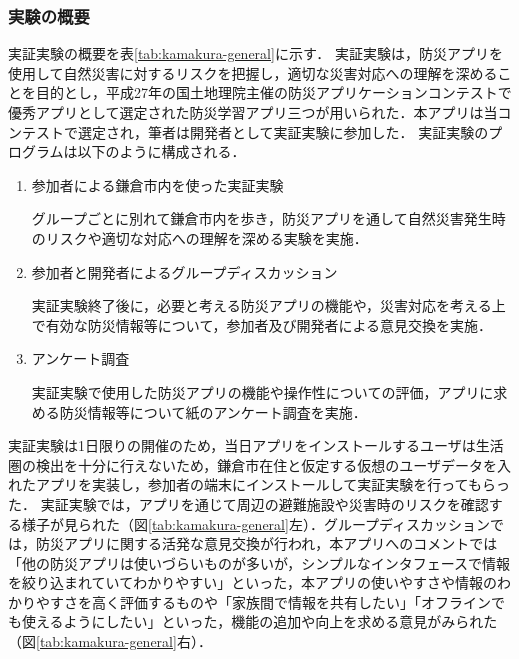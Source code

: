 \documentclass[a4paper]{jsarticle}
\begin{document}
\subsubsection{実験の概要}
実証実験の概要を表\ref{tab:kamakura-general}に示す．
実証実験は，防災アプリを使用して自然災害に対するリスクを把握し，適切な災害対応への理解を深めることを目的とし，平成27年の国土地理院主催の防災アプリケーションコンテストで優秀アプリとして選定された防災学習アプリ三つが用いられた．本アプリは当コンテストで選定され，筆者は開発者として実証実験に参加した．
実証実験のプログラムは以下のように構成される．

\begin{enumerate}
  \item 参加者による鎌倉市内を使った実証実験

  グループごとに別れて鎌倉市内を歩き，防災アプリを通して自然災害発生時のリスクや適切な対応への理解を深める実験を実施．

  \item 参加者と開発者によるグループディスカッション

  実証実験終了後に，必要と考える防災アプリの機能や，災害対応を考える上で有効な防災情報等について，参加者及び開発者による意見交換を実施．

  \item アンケート調査

  実証実験で使用した防災アプリの機能や操作性についての評価，アプリに求める防災情報等について紙のアンケート調査を実施．

\end{enumerate}

実証実験は1日限りの開催のため，当日アプリをインストールするユーザは生活圏の検出を十分に行えないため，鎌倉市在住と仮定する仮想のユーザデータを入れたアプリを実装し，参加者の端末にインストールして実証実験を行ってもらった．
実証実験では，アプリを通じて周辺の避難施設や災害時のリスクを確認する様子が見られた（図\ref{tab:kamakura-general}左）．グループディスカッションでは，防災アプリに関する活発な意見交換が行われ，本アプリへのコメントでは「他の防災アプリは使いづらいものが多いが，シンプルなインタフェースで情報を絞り込まれていてわかりやすい」といった，本アプリの使いやすさや情報のわかりやすさを高く評価するものや「家族間で情報を共有したい」「オフラインでも使えるようにしたい」といった，機能の追加や向上を求める意見がみられた（図\ref{tab:kamakura-general}右）．
\end{document}
